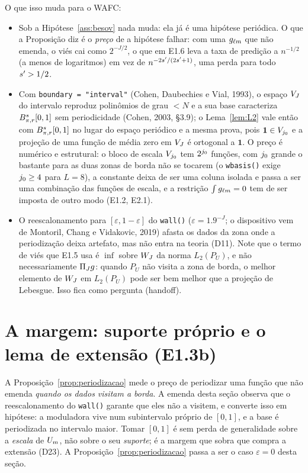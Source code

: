 \documentclass[11pt,a4paper]{article}
\begin{document}
O que isso muda para o WAFC:
\begin{itemize}[nosep]
  \item Sob a Hipótese~\ref{ass:besov} nada muda: ela já é uma hipótese
    periódica. O que a Proposição diz é o \emph{preço} de a hipótese falhar:
    com uma $g_{\ell m}$ que não emenda, o viés cai como $2^{-J/2}$, o
    que em E1.6 leva a taxa de predição a $n^{-1/2}$ (a menos de logaritmos)
    em vez de $n^{-2s'/(2s'+1)}$, uma perda para todo $s' > 1/2$.
  \item Com \texttt{boundary = "interval"} (Cohen, Daubechies e Vial, 1993),
    o espaço $V_{J}$ do intervalo reproduz polinômios de grau $< N$ e a sua
    base caracteriza $B^{s}_{\pi,r}[0,1]$ sem periodicidade (Cohen,
    2003, \S 3.9); o Lema~\ref{lem:L2} vale então com
    $B^{s}_{\pi,r}[0,1]$ no lugar do espaço periódico e a mesma prova,
    pois $\mathbf{1} \in V_{j_{0}}$ e a projeção de uma função de média
    zero em $V_{J}$ é ortogonal a $\mathbf{1}$. O preço é numérico e
    estrutural: o bloco de escala $V_{j_{0}}$ tem $2^{j_{0}}$ funções, com
    $j_{0}$ grande o bastante para as duas zonas de borda não se tocarem
    (o \texttt{wbasis()} exige $j_{0} \ge 4$ para $L = 8$), a constante
    deixa de ser uma coluna isolada e passa a ser uma combinação das funções
    de escala, e a restrição $\int g_{\ell m} = 0$ tem de ser imposta de
    outro modo (E1.2, E2.1).
  \item O reescalonamento para $[\varepsilon, 1-\varepsilon]$ do
    \texttt{wall()} ($\varepsilon = 1.9^{-J}$; o dispositivo vem de Montoril, Chang e
    Vidakovic, 2019) afasta os dados da zona onde a periodização deixa
    artefato, mas não entra na teoria (D11). Note que o termo de viés que
    E1.5 usa é $\inf$ sobre $W_{J}$ da norma $L_{2}(P_{U})$, e não
    necessariamente $\Pi_{J} g$: quando $P_{U}$ não visita a zona de borda, o
    melhor elemento de $W_{J}$ em $L_{2}(P_{U})$ pode ser bem melhor que a
    projeção de Lebesgue. Isso fica como pergunta (handoff).
\end{itemize}

\section{A margem: suporte próprio e o lema de extensão (E1.3b)}

A Proposição~\ref{prop:periodizacao} mede o preço de periodizar uma função
que não emenda \emph{quando os dados visitam a borda}. A emenda desta seção
observa que o reescalonamento do \texttt{wall()} garante que eles não a
visitem, e converte isso em hipótese: a moduladora vive num subintervalo
próprio de $[0,1]$, e a base é periodizada no intervalo maior. Tomar
$[0,1]$ é sem perda de generalidade sobre a \emph{escala} de $U_{m}$, não
sobre o seu \emph{suporte}; é a margem que sobra que compra a extensão
(D23). A Proposição~\ref{prop:periodizacao} passa a ser o caso
$\varepsilon = 0$ desta seção.
\end{document}
